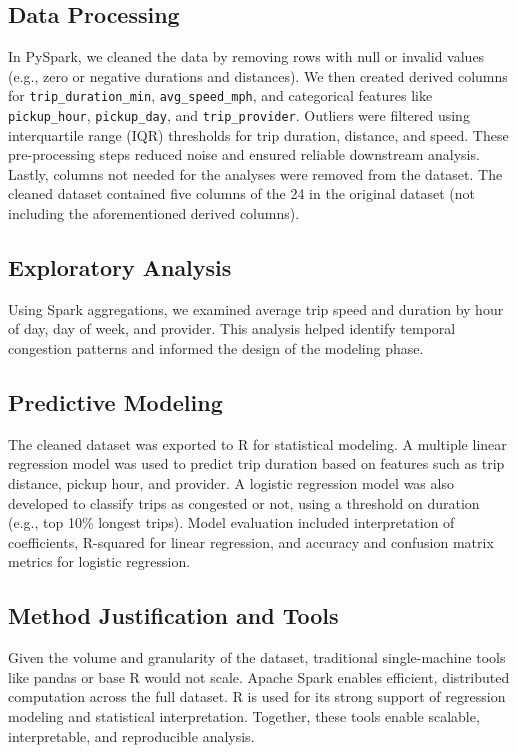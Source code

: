 \documentclass{article}
\begin{document}
\subsection{Data Processing}
In PySpark, we cleaned the data by removing rows with null or invalid values (e.g., zero or negative durations and distances). We then created derived columns for \texttt{trip\_duration\_min}, \texttt{avg\_speed\_mph}, and categorical features like \texttt{pickup\_hour}, \texttt{pickup\_day}, and \texttt{trip\_provider}. Outliers were filtered using interquartile range (IQR) thresholds for trip duration, distance, and speed. These pre-processing steps reduced noise and ensured reliable downstream analysis. Lastly, columns not needed for the analyses were removed from the dataset. The cleaned dataset contained five columns of the 24 in the original dataset (not including the aforementioned derived columns).

\subsection{Exploratory Analysis}
Using Spark aggregations, we examined average trip speed and duration by hour of day, day of week, and provider. This analysis helped identify temporal congestion patterns and informed the design of the modeling phase.

\subsection{Predictive Modeling}
The cleaned dataset was exported to R for statistical modeling. A multiple linear regression model was used to predict trip duration based on features such as trip distance, pickup hour, and provider. A logistic regression model was also developed to classify trips as congested or not, using a threshold on duration (e.g., top 10\% longest trips). Model evaluation included interpretation of coefficients, R-squared for linear regression, and accuracy and confusion matrix metrics for logistic regression.

\subsection{Method Justification and Tools}
Given the volume and granularity of the dataset, traditional single-machine tools like pandas or base R would not scale. Apache Spark enables efficient, distributed computation across the full dataset. R is used for its strong support of regression modeling and statistical interpretation. Together, these tools enable scalable, interpretable, and reproducible analysis.
\end{document}
